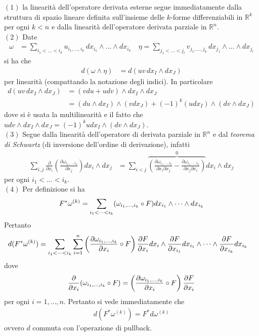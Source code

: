 \documentclass[twoside, 11pt]{amsbook}
\makeatletter
\newcommand{\0}{{(0)}}
\newcommand{\3}{{(3)}}
\theoremstyle{colonplain}
\theoremstyle{colondefinition}
\theoremstyle{colonremark}
\numberwithin{equation}{chapter}
\renewcommand{\proofname}{Dimostrazione}
\renewenvironment{proof}[1][\proofname]{\par
  \pushQED{\qed}%
  \normalfont \topsep6\p@\@plus6\p@\relax
  \trivlist
  \item[\hskip\labelsep\bfseries #1:]\ignorespaces
}{%
  \popQED\endtrivlist\@endpefalse
}
\makeatother
\begin{document}
\begin{proof} $(1)$ la linearità dell'operatore derivata esterne segue immediatamente dalla struttura di spazio lineare definita sull'insieme delle $k$-forme differenziabili in $\mathbb{R}^k$ per ogni $k < n$ e dalla linearità dell'operatore derivata parziale in $\mathbb{R}^n$. \\
$(2)$ Date
\begin{align}
    \omega &= \sum_{i_1 < \dots < i_k} u_{i_1, \dots, i_k} \, dx_{i_1} \wedge \dots \wedge dx_{i_k} \quad \eta = \sum_{j_1 < \dots < j_l} v_{j_1, \dots, j_k} \, dx_{j_1} \wedge \dots \wedge dx_{j_l}
\end{align}
si ha che
\begin{align}
    d(\omega \wedge \eta) &= d(uv \, dx_I \wedge dx_J)
\end{align}
per linearità (compattando la notazione degli indici). In particolare
\begin{align}
    d(uv \, dx_I \wedge dx_J) &= (vdu + udv) \wedge dx_I \wedge dx_J \\
    &= (du \wedge dx_I) \wedge (vdx_J) + (-1)^k(udx_I) \wedge (dv \wedge dx_J)
\end{align}
dove si è usata la multilinearità e il fatto che $udv \wedge dx_I \wedge dx_J = (-1)^k udx_I \wedge (dv \wedge dx_J)$. \\
$(3)$ Segue dalla linearità dell'operatore di derivata parziale in $\mathbb{R}^n$ e dal \textit{teorema di Schwartz} (di inversione dell'ordine di derivazione), infatti
\begin{align}
    \sum_{i, j}\frac{\partial}{\partial x_i}\left(\frac{\partial \omega_{i_1, \dots, i_k}}{\partial x_j}\right)dx_i \wedge dx_j &= \sum_{i < j}\overbrace{\left(\frac{\partial \omega_{i_1, \dots, i_k}}{\partial x_i\partial x_j} - \frac{\partial \omega_{i_1, \dots, i_k}}{\partial x_j \partial x_i}\right)}^{0}dx_i \wedge dx_j
\end{align}
per ogni $i_1 < \dots < i_k$. \\
$(4)$ Per definizione si ha
\begin{align}
    F^*\omega^{(k)} = \sum_{i_1 < \dots < i_k} (\omega_{i_1, \dots, i_k} \circ F) dx_{i_1} \wedge \dots \wedge dx_{i_k} \notag
\end{align}
Pertanto
\begin{align}
    d(F^*\omega^{(k)}) &= \sum_{i_1 < \dots < i_k}\sum_{i = 1}^n \left(\frac{\partial \omega_{i_1, \dots, i_k}}{\partial x_i} \circ F\right)\frac{\partial F}{\partial x_i} dx_i \wedge \frac{\partial F}{\partial x_{i_1}}dx_{i_1} \wedge \dots \wedge \frac{\partial F}{\partial x_{i_k}}dx_{i_k} \notag
\end{align}
dove
\begin{align}
    \frac{\partial}{\partial x_i}(\omega_{i_1, \dots, i_k} \circ F) = \left(\frac{\partial \omega_{i_1, \dots, i_k}}{\partial x_i} \circ F\right)\frac{\partial F}{\partial x_i} \notag
\end{align}
per ogni $i = 1, \dots, n$. Pertanto si vede immediatamente che
\begin{align}
    d(F^*\omega^{(k)}) = F^*d\omega^{(k)}
\end{align}
ovvero $d$ commuta con l'operazione di pullback.
\end{proof}
\end{document}
